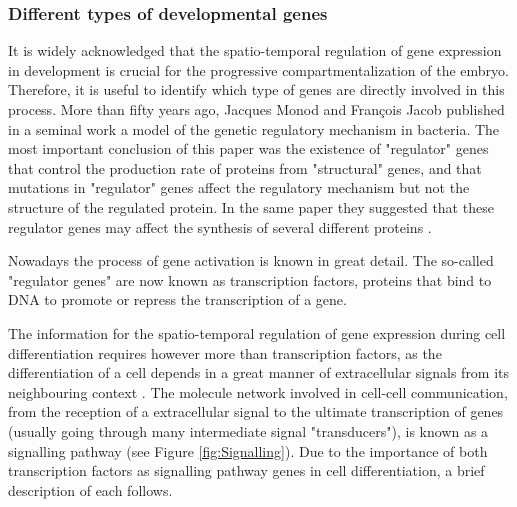 

\subsubsection{Different types of developmental genes}
It is widely acknowledged that the spatio-temporal regulation of gene expression in development is crucial for the progressive compartmentalization of the embryo. 
Therefore, it is useful to identify which type of genes are directly involved in this process. 
More than fifty years ago, Jacques Monod and Fran\c cois Jacob \citep{Jacob1961} published in a seminal work a model of the genetic regulatory mechanism in bacteria.
The most important conclusion of this paper was the existence of "regulator" genes that control the production rate of proteins from "structural" genes, and that mutations in "regulator" genes affect the regulatory mechanism but not the structure of the regulated protein. In the same paper they suggested that these regulator genes may affect the synthesis of several different proteins \citep{Jacob1961}.

Nowadays the process of gene activation is known in great detail. The so-called "regulator genes" are now known as transcription factors, proteins that bind to DNA to promote or repress the transcription of a gene. 

The information for the spatio-temporal regulation of gene expression during cell differentiation requires however more than transcription factors, as the differentiation of a cell depends in a great manner of extracellular signals from its neighbouring context \citep{Gilbert2014}.
The molecule network involved in cell-cell communication, from the reception of a extracellular signal to the ultimate transcription of genes (usually going through many intermediate signal "transducers"), is known as a signalling pathway (see Figure \ref{fig:Signalling}).
Due to the importance of both transcription factors as signalling pathway genes in cell differentiation, a brief description of each follows.

